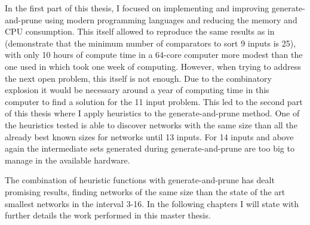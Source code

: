 \documentclass[../main.tex]{subfiles}
\begin{document}
In the first part of this thesis, I focused on implementing and improving generate-and-prune using modern programming languages and reducing the memory and CPU consumption. This itself allowed to reproduce the same results as in \cite{sortingnineinputs} (demonstrate that the minimum number of comparators to sort 9 inputs is 25), with only 10 hours of compute time in a 64-core computer more modest than the one used in \cite{sortingnineinputs} which took one week of computing. However, when trying to address the next open problem, this itself is not enough. Due to the combinatory explosion it would be necessary around a year of computing time in this computer to find a solution for the 11 input problem. This led to the second part of this thesis where I apply heuristics to the generate-and-prune method. One of the heuristics tested is able to discover networks with the same size than all the already best known sizes for networks until 13 inputs. For 14 inputs and above again the intermediate sets generated during generate-and-prune are too big to manage in the available hardware.

The combination of heuristic functions with generate-and-prune has dealt promising results, finding networks of the same size than the state of the art smallest networks in the interval 3-16. In the following chapters I will state with further details the work performed in this master thesis.
\newpage
\end{document}
